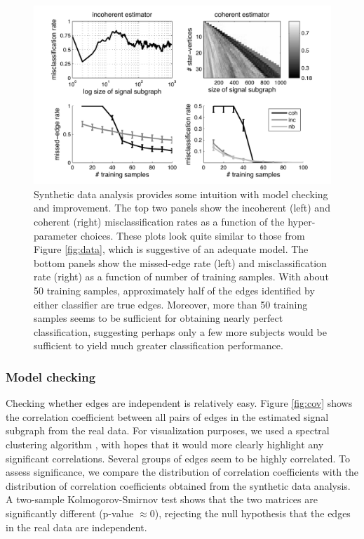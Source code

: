 \documentclass[10pt,journal,cspaper,compsoc]{IEEEtran}
\begin{document}
\begin{figure}[tb!]
	\centering
		\includegraphics[width=0.7\linewidth]{../figs/BLSA0317_Count_synthetic_Lhats.pdf}
	\caption{Synthetic data analysis provides some intuition with model checking and improvement.  The top two panels show the incoherent (left) and coherent (right) misclassification rates as a function of the hyper-parameter choices.  These plots look quite similar to those from Figure \ref{fig:data}, which is suggestive of an adequate model.  The bottom panels show the missed-edge rate (left) and misclassification rate (right) as a function of number of training samples.  With about 50 training samples, approximately half of the edges identified by either classifier are true edges.  Moreover, more than 50 training samples seems to be sufficient for obtaining nearly perfect classification, suggesting perhaps only a few more subjects would be sufficient to yield much greater classification performance.}
	\label{fig:synthetic}
\end{figure}

\subsubsection{Model checking} %
\label{ssub:model_checking}


Checking whether edges are independent is relatively easy.  Figure \ref{fig:cov} shows the correlation coefficient between all pairs of edges in the estimated signal subgraph from the real data.  For visualization purposes, we used a spectral clustering algorithm \cite{Dhillon2001}, with hopes that it would more clearly highlight any significant correlations.  Several groups of edges seem to be highly  correlated.  To assess significance, we compare the distribution of correlation coefficients with the distribution of correlation coefficients obtained from the synthetic data analysis.  A two-sample Kolmogorov-Smirnov test shows that the two matrices are significantly different (p-value $\approx 0$), rejecting the null hypothesis that the edges in the real data are independent. 
\end{document}
